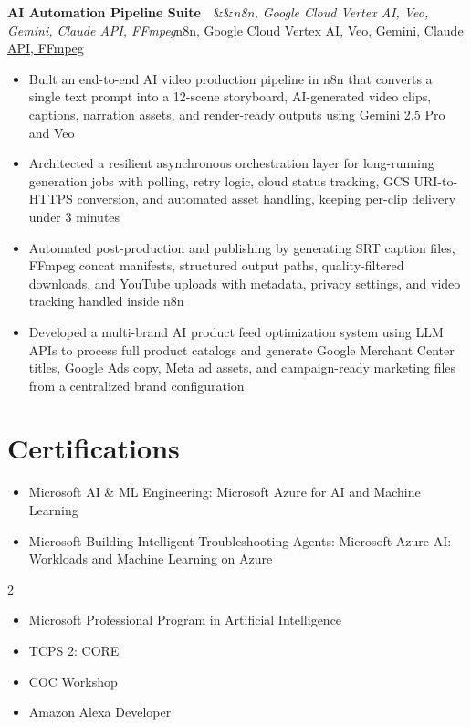 \documentclass[letterpaper,10pt]{article}
\newcommand{\project}[3]{%
  \Needspace{4\baselineskip}\vspace{2pt}\textbf{#1}\ \ \ifx&#3&\textit{#2}\else\href{#3}{\underline{#2}}\fi\par\vspace{-1pt}}
\begin{document}
\project{AI Automation Pipeline Suite}{n8n, Google Cloud Vertex AI, Veo, Gemini, Claude API, FFmpeg}{}
\begin{itemize}
  \item Built an end-to-end AI video production pipeline in n8n that converts a single text prompt into a 12-scene
        storyboard, AI-generated video clips, captions, narration assets, and render-ready outputs using Gemini 2.5 Pro and Veo
  \item Architected a resilient asynchronous orchestration layer for long-running generation jobs with polling, retry logic,
        cloud status tracking, GCS URI-to-HTTPS conversion, and automated asset handling, keeping per-clip delivery under 3 minutes
  \item Automated post-production and publishing by generating SRT caption files, FFmpeg concat manifests, structured output
        paths, quality-filtered downloads, and YouTube uploads with metadata, privacy settings, and video tracking handled inside n8n
  \item Developed a multi-brand AI product feed optimization system using LLM APIs to process full product catalogs and
        generate Google Merchant Center titles, Google Ads copy, Meta ad assets, and campaign-ready marketing files from a
        centralized brand configuration
\end{itemize}

\section{Certifications}
\begin{itemize}
  \item Microsoft AI \& ML Engineering: Microsoft Azure for AI and Machine Learning
  \item Microsoft Building Intelligent Troubleshooting Agents: Microsoft Azure AI: Workloads and Machine Learning on Azure
\end{itemize}
\vspace{-1.5pt}
\begin{multicols}{2}
\begin{itemize}
  \item Microsoft Professional Program in Artificial Intelligence
  \item TCPS 2: CORE
  \item COC Workshop
  \item Amazon Alexa Developer
\end{itemize}
\end{multicols}
\end{document}
